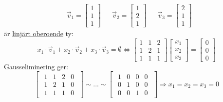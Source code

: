 \newpage
\begin{Ex}
	\begin{align*}
	&\vec{v}_1 = \begin{bmatrix} 1\\1\\1 \end{bmatrix}
	&&\vec{v}_2	= \begin{bmatrix} 1\\2\\1 \end{bmatrix}
	&&\vec{v}_3 = \begin{bmatrix} 2\\1\\1 \end{bmatrix}
	\end{align*}
	är \underline{linjärt oberoende} ty:
	\[
	x_1 \cdot \vec{v}_1 + x_2 \cdot \vec{v}_2 + x_3 \cdot \vec{v}_3 = \emptyset \Leftrightarrow \begin{bmatrix} 1 & 1 & 2\\1 & 2 & 1\\1&1&1 \end{bmatrix}\begin{bmatrix} x_1\\x_2\\x_3 \end{bmatrix} = \begin{bmatrix} 0\\0\\0 \end{bmatrix}
	\]
	Gausseliminering ger:
	\[
	\begin{bmatrix}
		\begin{array}{ccc|c}
			1 & 1 & 2 & 0\\
			1 & 2 & 1 & 0\\
			1 & 1 & 1 & 0
		\end{array}
	\end{bmatrix} \sim ... \sim
	\begin{bmatrix}
		\begin{array}{ccc|c}
			1 & 0 & 0 & 0\\
			0 & 1 & 0 & 0\\
			0 & 0 & 1 & 0
		\end{array}
	\end{bmatrix} \Rightarrow x_1 = x_2 = x_3 = 0
	\]
\end{Ex}
